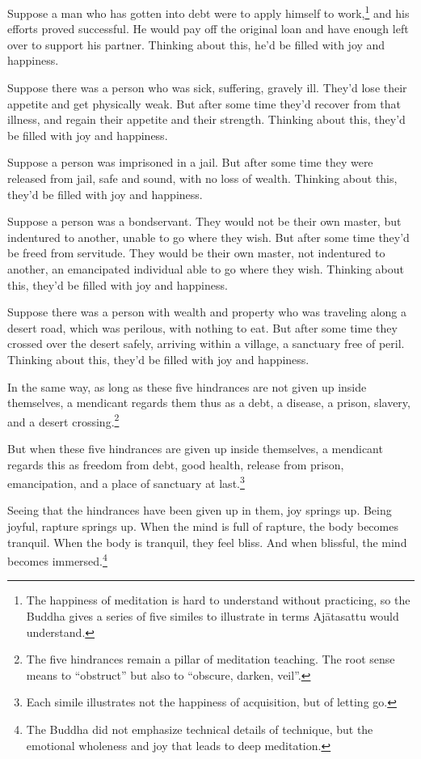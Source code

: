 \documentclass[12pt,openany]{book}%
\begin{document}
Suppose a man who has gotten into debt were to apply himself to work,\footnote{The happiness of meditation is hard to understand without practicing, so the Buddha gives a series of five similes to illustrate in terms \textsanskrit{Ajātasattu} would understand. } and his efforts proved successful. He would pay off the original loan and have enough left over to support his partner. Thinking about this, he’d be filled with joy and happiness. 

Suppose there was a person who was sick, suffering, gravely ill. They’d lose their appetite and get physically weak. But after some time they’d recover from that illness, and regain their appetite and their strength. Thinking about this, they’d be filled with joy and happiness. 

Suppose a person was imprisoned in a jail. But after some time they were released from jail, safe and sound, with no loss of wealth. Thinking about this, they’d be filled with joy and happiness. 

Suppose a person was a bondservant. They would not be their own master, but indentured to another, unable to go where they wish. But after some time they’d be freed from servitude. They would be their own master, not indentured to another, an emancipated individual able to go where they wish. Thinking about this, they’d be filled with joy and happiness. 

Suppose there was a person with wealth and property who was traveling along a desert road, which was perilous, with nothing to eat. But after some time they crossed over the desert safely, arriving within a village, a sanctuary free of peril. Thinking about this, they’d be filled with joy and happiness. 

In the same way, as long as these five hindrances are not given up inside themselves, a mendicant regards them thus as a debt, a disease, a prison, slavery, and a desert crossing.\footnote{The five hindrances remain a pillar of meditation teaching. The root sense means to “obstruct” but also to “obscure, darken, veil”. } 

But when these five hindrances are given up inside themselves, a mendicant regards this as freedom from debt, good health, release from prison, emancipation, and a place of sanctuary at last.\footnote{Each simile illustrates not the happiness of acquisition, but of letting go. } 

Seeing that the hindrances have been given up in them, joy springs up. Being joyful, rapture springs up. When the mind is full of rapture, the body becomes tranquil. When the body is tranquil, they feel bliss. And when blissful, the mind becomes immersed.\footnote{The Buddha did not emphasize technical details of technique, but the emotional wholeness and joy that leads to deep meditation. } 
\end{document}
